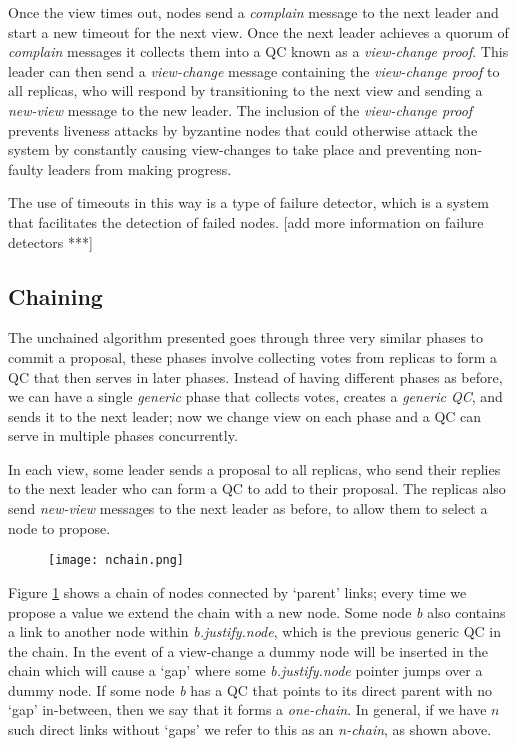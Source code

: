 Once the view times out, nodes send a \textit{complain} message to the next leader and start a new timeout for the next view. Once the next leader achieves a quorum of \textit{complain} messages it collects them into a QC known as a \textit{view-change proof}. This leader can then send a \textit{view-change} message containing the \textit{view-change proof} to all replicas, who will respond by transitioning to the next view and sending a \textit{new-view} message to the new leader. The inclusion of the \textit{view-change proof} prevents liveness attacks by byzantine nodes that could otherwise attack the system by constantly causing view-changes to take place and preventing non-faulty leaders from making progress.

The use of timeouts in this way is a type of failure detector, which is a system that facilitates the detection of failed nodes. [add more information on failure detectors ***]

\subsection{Chaining} \label{chaining}
The unchained algorithm presented goes through three very similar phases to commit a proposal, these phases involve collecting votes from replicas to form a QC that then serves in later phases. Instead of having different phases as before, we can have a single \textit{generic} phase that collects votes, creates a \textit{generic QC}, and sends it to the next leader; now we change view on each phase and a QC can serve in multiple phases concurrently.

In each view, some leader sends a proposal to all replicas, who send their replies to the next leader who can form a QC to add to their proposal. The replicas also send \textit{new-view} messages to the next leader as before, to allow them to select a node to propose.

\begin{figure}[h!]
\centering
\texttt{[image: nchain.png]}
\label{nchain}
\end{figure}

Figure \ref{nchain} shows a chain of nodes connected by `parent' links; every time we propose a value we extend the chain with a new node. Some node \textit{b} also contains a link to another node within \textit{b.justify.node}, which is the previous generic QC in the chain. In the event of a view-change a dummy node will be inserted in the chain which will cause a `gap' where some \textit{b.justify.node} pointer jumps over a dummy node. If some node \textit{b} has a QC that points to its direct parent with no `gap' in-between, then we say that it forms a \textit{one-chain}. In general, if we have $n$ such direct links without `gaps' we refer to this as an \textit{n-chain}, as shown above.

